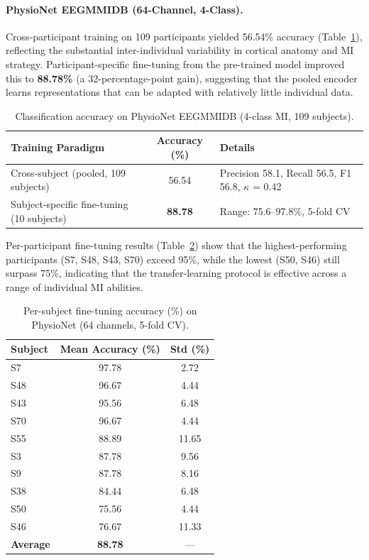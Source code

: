 \documentclass[12pt, a4paper]{article}
\begin{document}
\paragraph{PhysioNet EEGMMIDB (64-Channel, 4-Class).}

Cross-participant training on 109 participants yielded 56.54\% accuracy (Table~\ref{tab:physionet_results}), reflecting the substantial inter-individual variability in cortical anatomy and MI strategy. Participant-specific fine-tuning from the pre-trained model improved this to \textbf{88.78\%} (a 32-percentage-point gain), suggesting that the pooled encoder learns representations that can be adapted with relatively little individual data.

\begin{table}[htbp]
\centering
\caption{Classification accuracy on PhysioNet EEGMMIDB (4-class MI, 109 subjects).}
\label{tab:physionet_results}
\begin{tabular}{@{} l c >{\raggedright\arraybackslash}p{6.5cm} @{}}
\toprule
\textbf{Training Paradigm} & \textbf{Accuracy (\%)} & \textbf{Details} \\
\midrule
Cross-subject (pooled, 109 subjects) & 56.54 & Precision 58.1, Recall 56.5, F1 56.8, $\kappa$ = 0.42 \\
Subject-specific fine-tuning (10 subjects) & \textbf{88.78} & Range: 75.6--97.8\%, 5-fold CV \\
\bottomrule
\end{tabular}
\end{table}

Per-participant fine-tuning results (Table~\ref{tab:finetune_detail}) show that the highest-performing participants (S7, S48, S43, S70) exceed 95\%, while the lowest (S50, S46) still surpass 75\%, indicating that the transfer-learning protocol is effective across a range of individual MI abilities.

\begin{table}[htbp]
\centering
\caption{Per-subject fine-tuning accuracy (\%) on PhysioNet (64 channels, 5-fold CV).}
\label{tab:finetune_detail}
\begin{tabular}{lcc}
\toprule
\textbf{Subject} & \textbf{Mean Accuracy (\%)} & \textbf{Std (\%)} \\
\midrule
S7  & 97.78 & 2.72 \\
S48 & 96.67 & 4.44 \\
S43 & 95.56 & 6.48 \\
S70 & 96.67 & 4.44 \\
S55 & 88.89 & 11.65 \\
S3  & 87.78 & 9.56 \\
S9  & 87.78 & 8.16 \\
S38 & 84.44 & 6.48 \\
S50 & 75.56 & 4.44 \\
S46 & 76.67 & 11.33 \\
\midrule
\textbf{Average} & \textbf{88.78} & --- \\
\bottomrule
\end{tabular}
\end{table}
\end{document}
